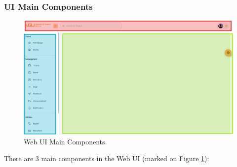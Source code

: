 	\subsubsection{UI Main Components}
	\begin{figure}[H]
		\centering
		\includegraphics[width=1\linewidth]{graphics/fe/fe-main-comp}
		\caption{Web UI Main Components}
		\label{fig:fe-main-comp}
	\end{figure}
	There are 3 main components in the Web UI (marked on Figure \ref{fig:fe-main-comp}):
	
